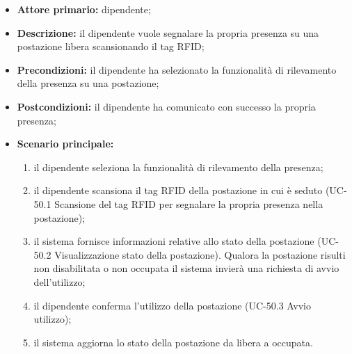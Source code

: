     \begin{itemize}
        \item \textbf{Attore primario:} dipendente;

        \item \textbf{Descrizione:} il dipendente vuole segnalare la propria presenza su una postazione libera scansionando il tag RFID;

        \item \textbf{Precondizioni:} il dipendente ha selezionato la funzionalità di rilevamento della presenza su una postazione;

        \item \textbf{Postcondizioni:} il dipendente ha comunicato con successo la propria presenza;

        \item \textbf{Scenario principale:}
            \begin{enumerate}
                \item il dipendente seleziona la funzionalità di rilevamento della presenza;
                \item il dipendente scansiona il tag RFID della postazione in cui è seduto (UC-50.1 Scansione del tag RFID per segnalare la propria presenza nella postazione);
                \item il sistema fornisce informazioni relative allo stato della postazione (UC-50.2 Visualizzazione stato della postazione). Qualora la postazione risulti non disabilitata o non occupata il sistema invierà una richiesta di avvio dell'utilizzo;
                \item il dipendente conferma l'utilizzo della postazione (UC-50.3 Avvio utilizzo);
                \item il sistema aggiorna lo stato della postazione da libera a occupata.
            \end{enumerate}
    \end{itemize} 


